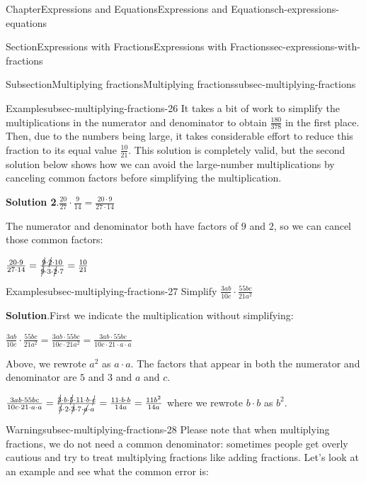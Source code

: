 \documentclass[twoside,11pt,]{book}
\newcommand{\blocktitlefont}{\relax}
\numberwithin{equation}{chapter}
\begin{document}
\begin{chapterptx}{Chapter}{Expressions and Equations}{}{Expressions and Equations}{}{}{ch-expressions-equations}
\begin{sectionptx}{Section}{Expressions with Fractions}{}{Expressions with Fractions}{}{}{sec-expressions-with-fractions}
\begin{subsectionptx}{Subsection}{Multiplying fractions}{}{Multiplying fractions}{}{}{subsec-multiplying-fractions}
\begin{example}{Example}{}{subsec-multiplying-fractions-26}
It takes a bit of work to simplify the multiplications in the numerator and denominator to obtain \(\frac{180}{378}\) in the first place. Then, due to the numbers being large, it takes considerable effort to reduce this fraction to its equal value \(\frac{10}{21}\). This solution is completely valid, but the second solution below shows how we can avoid the large-number multiplications by canceling common factors before simplifying the multiplication.%
\par\smallskip%
\noindent\textbf{\blocktitlefont Solution 2}.\hypertarget{subsec-multiplying-fractions-26-3}{}\quad{}\(\frac{20}{27} \cdot \frac{9}{14} = \frac{20 \cdot 9}{27 \cdot 14}\)%
\par
The numerator and denominator both have factors of \(9\) and \(2\), so we can cancel those common factors:%
\par
\(\frac{20 \cdot 9}{27 \cdot 14} = \frac{\cancel{9} \cdot \cancel{2} \cdot 10}{\cancel{9} \cdot 3 \cdot \cancel{2} \cdot 7} = \frac{10}{21}\)%
\end{example}
\begin{example}{Example}{}{subsec-multiplying-fractions-27}%
Simplify \(\frac{3ab}{10c} \cdot \frac{55bc}{21a^2}\)%
\par\smallskip%
\noindent\textbf{\blocktitlefont Solution}.\hypertarget{subsec-multiplying-fractions-27-2}{}\quad{}First we indicate the multiplication without simplifying:%
\par
\(\frac{3ab}{10c} \cdot \frac{55bc}{21a^2} = \frac{3ab \cdot 55bc}{10c \cdot 21a^2} = \frac{3ab \cdot 55bc}{10c \cdot 21 \cdot a \cdot a}\)%
\par
Above, we rewrote \(a^2\) as \(a \cdot a\). The factors that appear in both the numerator and denominator are \(5\) and \(3\) and \(a\) and \(c\).%
\par
\(\frac{3ab \cdot 55bc}{10c \cdot 21 \cdot a \cdot a} = \frac{\cancel{3} \cdot b \cdot \cancel{5} \cdot 11 \cdot b \cdot \cancel{c}}{\cancel{5} \cdot 2 \cdot \cancel{3} \cdot 7 \cdot \cancel{a} \cdot a} = 
\frac{11 \cdot b \cdot b}{14a}
= \frac{11b^2}{14a}\) where we rewrote \(b \cdot b\) as \(b^2\).%
\end{example}
\begin{warning}{Warning}{}{subsec-multiplying-fractions-28}%
Please note that when multiplying fractions, we do not need a common denominator: sometimes people get overly cautious and try to treat multiplying fractions like adding fractions. Let's look at an example and see what the common error is:%
\begin{itemize}[label=\textbullet]

\end{itemize}
\end{warning}
\end{subsectionptx}
\end{sectionptx}
\end{chapterptx}
\end{document}
